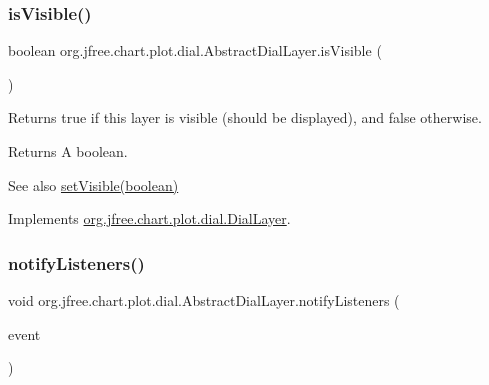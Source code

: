 \mbox{\label{classorg_1_1jfree_1_1chart_1_1plot_1_1dial_1_1_abstract_dial_layer_a0e4e9aff1a280718d2018d9e94c28027}} 
\subsubsection{\texorpdfstring{is\+Visible()}{isVisible()}}
{\footnotesize\ttfamily boolean org.\+jfree.\+chart.\+plot.\+dial.\+Abstract\+Dial\+Layer.\+is\+Visible (\begin{DoxyParamCaption}{ }\end{DoxyParamCaption})}

Returns {\ttfamily true} if this layer is visible (should be displayed), and {\ttfamily false} otherwise.

\begin{DoxyReturn}{Returns}
A boolean.
\end{DoxyReturn}
\begin{DoxySeeAlso}{See also}
\mbox{\hyperlink{classorg_1_1jfree_1_1chart_1_1plot_1_1dial_1_1_abstract_dial_layer_adb2e0eb36094ed7735624cc8e0060710}{set\+Visible(boolean)}} 
\end{DoxySeeAlso}


Implements \mbox{\hyperlink{interfaceorg_1_1jfree_1_1chart_1_1plot_1_1dial_1_1_dial_layer_a54a8415c6f856c550d1b92cf3139731d}{org.\+jfree.\+chart.\+plot.\+dial.\+Dial\+Layer}}.

\mbox{\label{classorg_1_1jfree_1_1chart_1_1plot_1_1dial_1_1_abstract_dial_layer_adc738beac6025c974b0088a54718cecc}} 
\subsubsection{\texorpdfstring{notify\+Listeners()}{notifyListeners()}}
{\footnotesize\ttfamily void org.\+jfree.\+chart.\+plot.\+dial.\+Abstract\+Dial\+Layer.\+notify\+Listeners (\begin{DoxyParamCaption}\item[{\mbox{\hyperlink{classorg_1_1jfree_1_1chart_1_1plot_1_1dial_1_1_dial_layer_change_event}{Dial\+Layer\+Change\+Event}}}]{event }\end{DoxyParamCaption})\hspace{0.3cm}{\ttfamily [protected]}}


